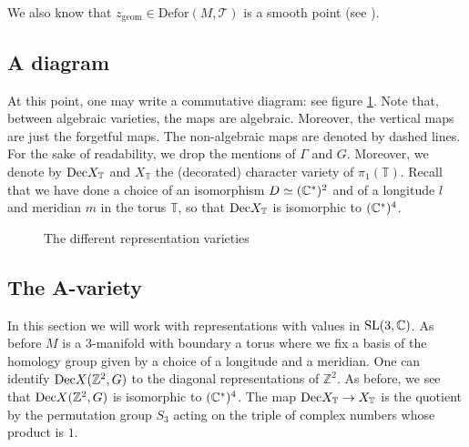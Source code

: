 We also know that $z_{\mathrm{geom}}\in \mathrm{Defor}(M,\mathcal{T})$ is a smooth point (see \cite{BFGKR}). 


\subsection{A diagram}

At this point, one may write a commutative diagram: see figure \ref{fig:diagram}. Note that, between algebraic varieties, the maps are algebraic. Moreover, the vertical maps are just the forgetful maps. The non-algebraic maps are denoted by dashed lines. For the sake of readability, we drop the mentions of $\Gamma$ and $G$. Moreover, we denote by $\mathrm{Dec}X_{\mathbb T}$ and $X_{\mathbb T}$ the (decorated) character variety of $\pi_1(\mathbb T)$. Recall that we have done a choice of an isomorphism $D\simeq (\mathbb{C}^*)^2$ and of a longitude $l$ and meridian $m$ in the torus $\mathbb T$, so that $\mathrm{Dec}X_{\mathbb T}$ is isomorphic to $(\mathbb{C}^*)^4$.
\begin{figure}[ht]
\begin{center}
\xymatrixcolsep{3.5pc}
\end{center}
\caption{The different representation varieties}\label{fig:diagram}
\end{figure}


\subsection{The A-variety}

In this section we will work with representations with values in $\textrm{SL}(3,\mathbb{C})$. As before $M$ is a 3-manifold with boundary a torus where we fix a basis 
of the homology group given by a choice of a longitude and a meridian. One can identify $\mathrm{Dec}X(\mathbb Z^2,G)$ to the diagonal representations of $\mathbb Z^2$.  As before, we see that
$\mathrm{Dec}X(\mathbb Z^2,G)$ is isomorphic to $(\mathbb{C}^*)^4$.  The map $\mathrm{Dec}X_{\mathbb T}\rightarrow X_{\mathbb T}$ is the quotient by the permutation group $S_3$ acting on the triple of complex numbers whose product is $1$.

